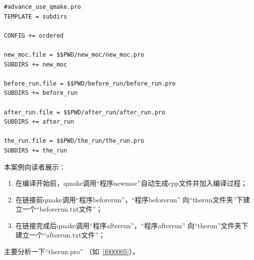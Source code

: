 \FloatBarrier
\begin{lstlisting}[label=f000004,
caption=GoodLuck,
title=\lstlistingname\ \thelstlisting
]
#advance_use_qmake.pro
TEMPLATE = subdirs

CONFIG += ordered

new_moc.file = $$PWD/new_moc/new_moc.pro
SUBDIRS += new_moc

before_run.file = $$PWD/before_run/before_run.pro
SUBDIRS += before_run

after_run.file = $$PWD/after_run/after_run.pro
SUBDIRS += after_run

the_run.file = $$PWD/the_run/the_run.pro
SUBDIRS += the_run
\end{lstlisting}          %

本案例向读者展示：
\begin{enumerate}
\item 在编译开始前，qmake调用“程序new\underline{\hspace{0.5em}}moc”自动生成cpp文件并加入编译过程；
\item 在链接前qmake调用“程序before\underline{\hspace{0.5em}}run”，“程序before\underline{\hspace{0.5em}}run”
向“the\underline{\hspace{0.5em}}run文件夹”下建立一个“before\underline{\hspace{0.5em}}run.txt文件”；
\item 在链接完成后qmake调用“程序after\underline{\hspace{0.5em}}run”，“程序after\underline{\hspace{0.5em}}run”
向“the\underline{\hspace{0.5em}}run”文件夹下建立一个“after\underline{\hspace{0.5em}}run.txt文件”；
\end{enumerate}

主要分析一下“the\underline{\hspace{0.5em}}run.pro”
（如\lstlistingname\ \ref{f000005}）。



